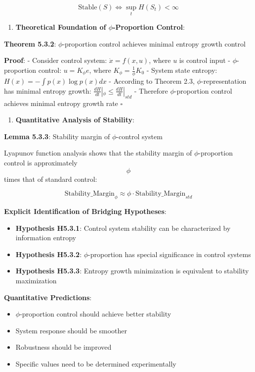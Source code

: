 \begin{equation}
\text{Stable}(S) \Leftrightarrow \sup_t H(S_t) < \infty
\end{equation}

\begin{enumerate}
\item \textbf{Theoretical Foundation of $\phi$-Proportion Control}:
\end{enumerate}
   \textbf{Theorem 5.3.2}: $\phi$-proportion control achieves minimal entropy growth control
\label{thm:5.3.2}
   
   \textbf{Proof}:
   - Consider control system: $\dot{x} = f(x, u)$, where $u$ is control input
   - $\phi$-proportion control: $u = K_\phi e$, where $K_\phi = \frac{1}{\phi}K_0$
   - System state entropy: $H(x) = -\int p(x) \log p(x) dx$
   - According to Theorem 2.3, $\phi$-representation has minimal entropy growth: $\frac{dH}{dt}|_\phi \leq \frac{dH}{dt}|_{std}$
   - Therefore $\phi$-proportion control achieves minimal entropy growth rate $\square$

\begin{enumerate}
\item \textbf{Quantitative Analysis of Stability}:
\end{enumerate}
   \textbf{Lemma 5.3.3}: Stability margin of $\phi$-control system
\label{lemma:5.3.3}
   
   Lyapunov function analysis shows that the stability margin of $\phi$-proportion control is approximately $$\phi$$ times that of standard control:
   
\begin{equation}
\text{Stability\_Margin}_{\phi} \approx \phi \cdot \text{Stability\_Margin}_{std}
\end{equation}

\textbf{Explicit Identification of Bridging Hypotheses}:
\begin{itemize}
\item \textbf{Hypothesis H5.3.1}: Control system stability can be characterized by information entropy
\item \textbf{Hypothesis H5.3.2}: $\phi$-proportion has special significance in control systems
\item \textbf{Hypothesis H5.3.3}: Entropy growth minimization is equivalent to stability maximization
\end{itemize}

\textbf{Quantitative Predictions}:
\begin{itemize}
\item $\phi$-proportion control should achieve better stability
\item System response should be smoother
\item Robustness should be improved
\item Specific values need to be determined experimentally
\end{itemize}

